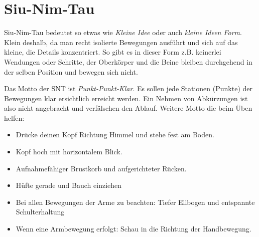 \section{Siu-Nim-Tau}

Siu-Nim-Tau bedeutet so etwas wie \textit{Kleine Idee} oder auch \textit{kleine Ideen Form}. Klein deshalb, da man recht isolierte Bewegungen ausf\"uhrt und sich auf das kleine, die Details konzentriert. So gibt es in dieser Form z.B. keinerlei Wendungen oder Schritte, der Oberk\"orper und die Beine bleiben durchgehend in der selben Position und bewegen sich nicht.

Das Motto der SNT ist \textit{Punkt-Punkt-Klar}. Es sollen jede Stationen (Punkte) der Bewegungen klar ersichtlich erreicht werden. Ein Nehmen von Abk\"urzungen ist also nicht angebracht und verf\"alschen den Ablauf. Weitere Motto die beim \"Uben helfen:

\begin{itemize}
	\item Dr\"ucke deinen Kopf Richtung Himmel und stehe fest am Boden.
	\item Kopf hoch mit horizontalem Blick.
	\item Aufnahmef\"ahiger Brustkorb und aufgerichteter R\"ucken.
	\item H\"ufte gerade und Bauch einziehen
	\item Bei allen Bewegungen der Arme zu beachten: Tiefer Ellbogen und entspannte Schulterhaltung
	\item Wenn eine Armbewegung erfolgt: Schau in die Richtung der Handbewegung.
\end{itemize}

 



